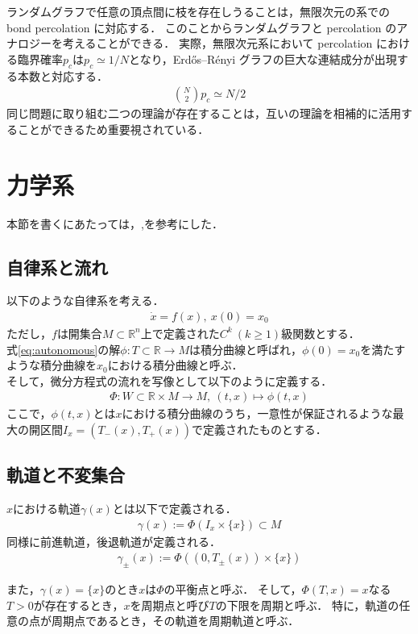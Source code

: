 \documentclass[../main]{subfiles}
\begin{document}
ランダムグラフで任意の頂点間に枝を存在しうることは，無限次元の系での bond percolation に対応する．
このことからランダムグラフと percolation のアナロジーを考えることができる．
実際，無限次元系において percolation における臨界確率$p_c$は$p_c\simeq 1/N$となり，Erdős–Rényi グラフの巨大な連結成分が出現する本数と対応する．
\begin{align*}
    \binom{N}{2}p_c\simeq N/2
\end{align*}
同じ問題に取り組む二つの理論が存在することは，互いの理論を相補的に活用することができるため重要視されている．
\section{力学系}
本節を書くにあたっては，\cite{teschlordinary},\cite{Ciesielski+2012+2110+2128}を参考にした．
\subsection{自律系と流れ}
以下のような自律系を考える．
\begin{align}
    \label{eq:autonomous}
    \dot{x}=f(x),\ x(0)=x_0
\end{align}
ただし，$f$は開集合$M\subset \mathbb{R}^n$上で定義された$C^k\ (k\geq 1)$級関数とする．\\
式\eqref{eq:autonomous}の解$\phi:T\subset \mathbb{R}\to M$は積分曲線と呼ばれ，$\phi(0)=x_0$を満たすような積分曲線を$x_0$における積分曲線と呼ぶ．\\
そして，微分方程式の流れを写像として以下のように定義する．
\begin{align*}
    \Phi:W\subset\mathbb{R}\times M\to M,\ (t,x)\mapsto \phi(t,x)
\end{align*}
ここで，$\phi(t,x)$とは$x$における積分曲線のうち，一意性が保証されるような最大の開区間$I_x=(T_-(x),T_+(x))$で定義されたものとする．
\subsection{軌道と不変集合}
$x$における軌道$\gamma(x)$とは以下で定義される．
\begin{align*}
    \gamma(x):=\Phi(I_x\times \{x\})\subset M
\end{align*}
同様に前進軌道，後退軌道が定義される．
\begin{align*}
    \gamma_\pm(x):=\Phi((0,T_\pm (x))\times \{x\})
\end{align*}

また，$\gamma(x)=\{x\}$のとき$x$は$\Phi$の平衡点と呼ぶ．
そして，$\Phi(T,x)=x$なる$T>0$が存在するとき，$x$を周期点と呼び$T$の下限を周期と呼ぶ．
特に，軌道の任意の点が周期点であるとき，その軌道を周期軌道と呼ぶ．
\end{document}
